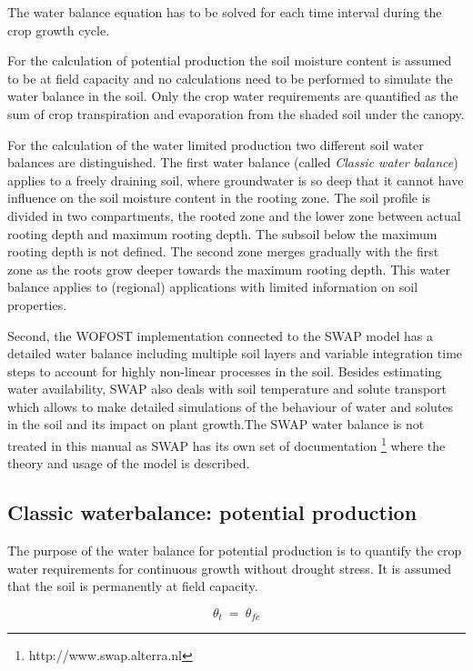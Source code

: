 The water balance equation has to be solved for each time interval during the crop growth cycle.

For the calculation of potential production the soil moisture content is assumed to be at field capacity and no calculations need to be performed to simulate the water balance in the soil. Only the crop water requirements are quantified as the sum of crop transpiration and evaporation from the shaded soil under the canopy. 

For the calculation of the water limited production two different soil water balances are distinguished. The first water balance (called \emph{Classic water balance}) applies to a freely draining soil, where groundwater is so deep that it cannot have influence on the soil moisture content in the rooting zone. The soil profile is divided in two compartments, the rooted zone and the lower zone between actual rooting depth and maximum rooting depth. The subsoil below the maximum rooting depth is not defined. The second zone merges gradually with the first zone as the roots grow deeper towards the maximum rooting depth. This water balance applies to (regional) applications with limited information on soil properties.

Second, the WOFOST implementation connected to the SWAP model has a detailed water balance including multiple soil layers and variable integration time steps to account for highly non-linear processes in the soil. Besides estimating water availability, SWAP also deals with soil temperature and solute transport which allows to make detailed simulations of the behaviour of water and solutes in the soil and its impact on plant growth.The SWAP water balance is not treated in this manual as SWAP has its own set of documentation \footnote{http://www.swap.alterra.nl} where the theory and usage of the model is described.

\subsection{Classic waterbalance: potential production}
\label{sec:WATPP}

The purpose of the water balance for potential production is to quantify the crop water requirements for continuous growth without drought stress. It is assumed that the soil is permanently at field capacity.

\begin{equation}
\label{eq:6.15}
\theta  _{t} ~ =~\theta  _{fc} 
\end{equation}

